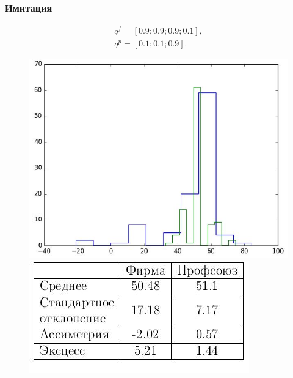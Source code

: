 \documentclass {beamer}
\begin{document}
\begin{frame}
	\frametitle{Имитация}
 \begin{gather*}
 q^f = \left[ 0.9; 0.9; 0.9; 0.1 \right], \\
 q^p = \left[ 0.1; 0.1; 0.9 \right].
 \end{gather*}
	\begin{figure}
		\begin{minipage}[b]{0.45\textwidth}
			
			\includegraphics[width=\textwidth]{firm2}
		\end{minipage}
		\begin{minipage}[b]{0.45\textwidth}
			
			\includegraphics[width=\textwidth]{firmtable2}
		\end{minipage}
		
	\end{figure}
\end{frame}
\end{document}

